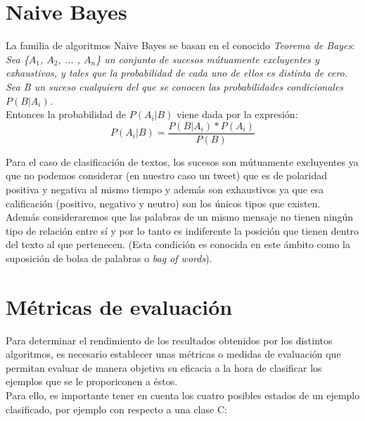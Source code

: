 \documentclass[a4paper,12pt]{report}
\begin{document}
\section{Naive Bayes}

{\setlength{\parindent}{0cm}
La familia de algoritmos Naive Bayes se basan en el conocido \textit{Teorema de Bayes}:} \\

{\setlength{\parindent}{0cm}
\textit{Sea \{$A_1$, $A_2$, ... , $A_n$\} un conjunto de sucesos mútuamente excluyentes y exhaustivos, y tales que la probabilidad de cada uno de ellos es distinta de cero. Sea B un suceso cualquiera del que se conocen las probabilidades condicionales $P(B|A_i)$.}
\vspace{2mm}\\
Entonces la probabilidad de $P(A_i |B)$ viene dada por la expresión:}
\vspace{4mm}
\[ P(A_i | B) = \frac{P(B|A_i) * P(A_i)}{P(B)}  \]

\vspace{4mm}
{\setlength{\parindent}{0cm}
Para el caso de clasificación de textos, los sucesos son mútuamente excluyentes ya que no podemos considerar (en nuestro caso un tweet) que es de polaridad positiva y negativa al mismo tiempo y además son exhaustivos ya que esa calificación (positivo, negativo y neutro) son los únicos tipos que existen.}
\vspace{2mm}\\
Además consideraremos que las palabras de un mismo mensaje no tienen ningún tipo de relación entre sí y por lo tanto es indiferente la posición que tienen dentro del texto al que pertenecen. (Esta condición es conocida en este ámbito como la suposición de bolsa de palabras o \textit{bag of words}). 
\vspace{4mm}


\section{Métricas de evaluación}

{\setlength{\parindent}{0cm}
Para determinar el rendimiento de los resultados obtenidos por los distintos algoritmos, es necesario establecer unas métricas o medidas de evaluación que permitan evaluar de manera objetiva su eficacia a la hora de clasificar los ejemplos que se le proporiconen a éstos.}
\vspace{4mm}\\
Para ello, es importante tener en cuenta los cuatro posibles estados de un ejemplo clasificado, por ejemplo con respecto a una clase C:
\end{document}
